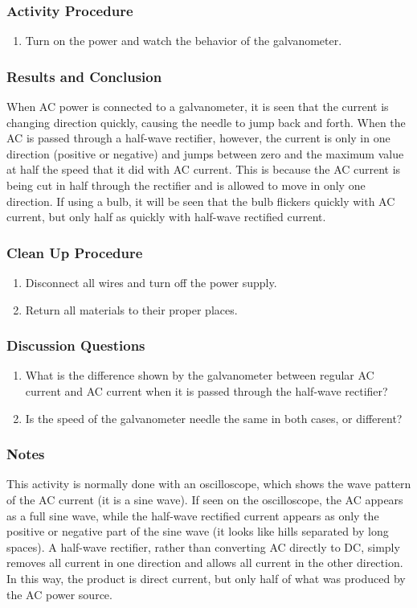 \subsubsection*{Activity Procedure}
\begin{enumerate}
\item{Turn on the power and watch the behavior of the galvanometer.}
\end{enumerate}

\subsubsection*{Results and Conclusion}
When AC power is connected to a galvanometer, it is seen that the current is changing direction quickly, causing the needle to jump back and forth.  When the AC is passed through a half-wave rectifier, however, the current is only in one direction (positive or negative) and jumps between zero and the maximum value at half the speed that it did with AC current.
This is because the AC current is being cut in half through the rectifier and is allowed to move in only one direction.  If using a bulb, it will be seen that the bulb flickers quickly with AC current, but only half as quickly with half-wave rectified current.

\subsubsection*{Clean Up Procedure}
\begin{enumerate}
\item{Disconnect all wires and turn off the power supply.}
\item{Return all materials to their proper places.}
\end{enumerate}

\subsubsection*{Discussion Questions}
\begin{enumerate}
\item{What is the difference shown by the galvanometer between regular AC current and AC current when it is passed through the half-wave rectifier?}
\item{Is the speed of the galvanometer needle the same in both cases, or different?}
\end{enumerate}

\subsubsection*{Notes}
This activity is normally done with an oscilloscope, which shows the wave pattern of the AC current (it is a sine wave).  If seen on the oscilloscope, the AC appears as a full sine wave, while the half-wave rectified current appears as only the positive or negative part of the sine wave (it looks like hills separated by long spaces).
A half-wave rectifier, rather than converting AC directly to DC, simply removes all current in one direction and allows all current in the other direction.  In this way, the product is direct current, but only half of what was produced by the AC power source.
